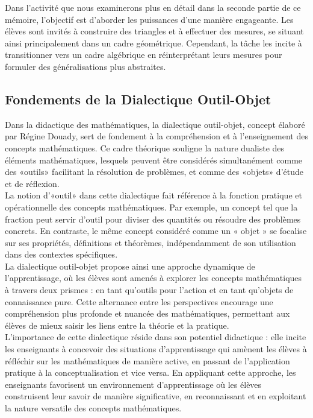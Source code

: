 Dans l'activité que nous examinerons plus en détail dans la seconde partie de ce mémoire,
l'objectif est d'aborder les puissances d'une manière engageante.
Les élèves sont invités à construire des triangles et à effectuer des mesures,
se situant ainsi principalement dans un cadre géométrique.
Cependant,
la tâche les incite à transitionner vers un cadre algébrique en réinterprétant leurs mesures pour formuler des généralisations plus abstraites.

\subsection{Fondements de la Dialectique Outil-Objet}

Dans la didactique des mathématiques,
la dialectique outil-objet,
concept élaboré par Régine Douady,
sert de fondement à la compréhension et à l'enseignement des concepts mathématiques.
Ce cadre théorique souligne la nature dualiste des éléments mathématiques,
lesquels peuvent être considérés simultanément comme des «outils» facilitant la résolution de problèmes,
et comme des «objets» d'étude et de réflexion.\\

La notion d'«outil» dans cette dialectique fait référence à la fonction pratique et opérationnelle des concepts mathématiques.
Par exemple,
un concept tel que la fraction peut servir d'outil pour diviser des quantités ou résoudre des problèmes concrets.
En contraste,
le même concept considéré comme un « objet » se focalise sur ses propriétés,
définitions et théorèmes,
indépendamment de son utilisation dans des contextes spécifiques.\\

La dialectique outil-objet propose ainsi une approche dynamique de l'apprentissage,
où les élèves sont amenés à explorer les concepts mathématiques à travers deux prismes :
en tant qu'outils pour l'action et en tant qu'objets de connaissance pure.
Cette alternance entre les perspectives encourage une compréhension plus profonde et nuancée des mathématiques,
permettant aux élèves de mieux saisir les liens entre la théorie et la pratique.\\

L'importance de cette dialectique réside dans son potentiel didactique :
elle incite les enseignants à concevoir des situations d'apprentissage qui amènent les élèves à réfléchir sur les mathématiques de manière active,
en passant de l'application pratique à la conceptualisation et vice versa.
En appliquant cette approche,
les enseignants favorisent un environnement d'apprentissage où les élèves construisent leur savoir de manière significative,
en reconnaissant et en exploitant la nature versatile des concepts mathématiques.

